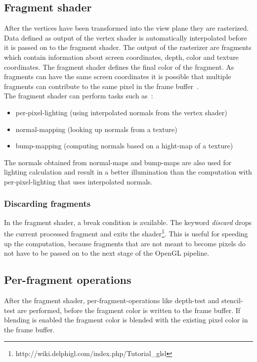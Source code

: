 \subsection{Fragment shader}	
After the vertices have been transformed into the view plane they are rasterized. Data defined as output of the vertex shader is automatically interpolated before it is passed on to the fragment shader. The output of the rasterizer are fragments which contain information about screen coordinates, depth, color and texture coordinates. The fragment shader defines the final color of the fragment. As fragments can have the same screen coordinates it is possible that multiple fragments can contribute to the same pixel in the frame buffer~\cite{book:computerGraphicsHill}.\\
The fragment shader can perform tasks such as~\cite{book:computerGraphicsHill}: %
\begin{itemize}%
	\item per-pixel-lighting (using interpolated normals from the vertex shader)
	\item normal-mapping (looking up normals from a texture)
	\item bump-mapping (computing normals based on a hight-map of a texture)
\end{itemize}
The normals obtained from normal-maps and bump-maps are also used for lighting calculation and result in a better illumination than the computation with per-pixel-lighting that uses interpolated normals.

\subsubsection{Discarding fragments}
In the fragment shader, a break condition is available. The keyword \emph{discard} drops the current processed fragment and exits the shader\footnote{http://wiki.delphigl.com/index.php/Tutorial{\_}glsl}. This is useful for speeding up the computation, because fragments that are not meant to become pixels do not have to be passed on to the next stage of the OpenGL pipeline.\\

\subsection{Per-fragment operations}
After the fragment shader, per-fragment-operations like depth-test and stencil-test are performed, before the fragment color is written to the frame buffer. If blending is enabled the fragment color is blended with the existing pixel color in the frame buffer.
